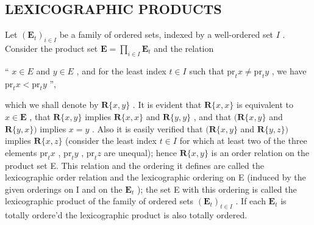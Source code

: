 \subsection{LEXICOGRAPHIC PRODUCTS}

Let \((\mathbf{E}_t)_{i\in I}\) be a family of ordered sets, indexed by a well-ordered set \(I\) . Consider the product set \(\mathbf{E} = \prod_{i\in I}\mathbf{E}_t\) and the relation

`` \(x \in E\) and \(y \in E\) , and for the least index \(t \in I\) such that \(\mathrm{pr}_t x \neq \mathrm{pr}_t y\) , we have \(\mathrm{pr}_t x < \mathrm{pr}_t y\) '',

which we shall denote by \(\mathbf{R}\{x, y\}\) . It is evident that \(\mathbf{R}\{x, x\}\) is equivalent to \(x \in \mathbf{E}\) , that \(\mathbf{R}\{x, y\}\) implies \(\mathbf{R}\{x, x\}\) and \(\mathbf{R}\{y, y\}\) , and that \((\mathbf{R}\{x, y\}\) and \(\mathbf{R}\{y, x\})\) implies \(x = y\) . Also it is easily verified that \((\mathbf{R}\{x, y\}\) and \(\mathbf{R}\{y, z\})\) implies \(\mathbf{R}\{x, z\}\) (consider the least index \(t \in I\) for which at least two of the three elements \(\mathrm{pr}_t x\) , \(\mathrm{pr}_t y\) , \(\mathrm{pr}_t z\) are unequal); hence \(\mathbf{R}\{x, y\}\) is an order relation on the product set E. This relation and the ordering it defines are called the lexicographic order relation and the lexicographic ordering on E (induced by the given orderings on I and on the \(\mathbf{E}_t\) ); the set E with this ordering is called the lexicographic product of the family of ordered sets \((\mathbf{E}_t)_{t \in I}\) . If each \(\mathbf{E}_t\) is totally ordere'd the lexicographic product is also totally ordered.

